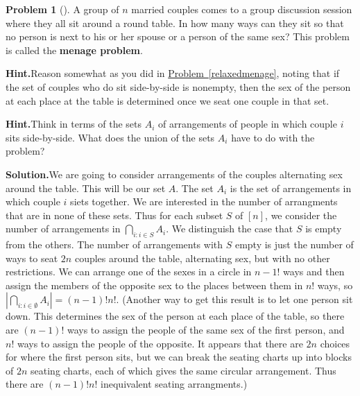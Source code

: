 \documentclass[10pt,]{book}
\newcommand{\terminology}[1]{\textbf{#1}}
\theoremstyle{plain}
\theoremstyle{definition}
\newtheorem{activity}[project]{Problem}
\theoremstyle{definition}
\numberwithin{equation}{chapter}
\begin{document}
\begin{activity}[]\label{activity-237}
A group of \(n\) married couples comes to a group discussion session where they all sit around a round table. In how many ways can they sit so that no person is next to his or her spouse or a person of the same sex? This problem is called the \terminology{menage problem}.%
\par\medskip\noindent%
\textbf{Hint.}\quad Reason somewhat as you did in \hyperref[relaxedmenage]{Problem~\ref{relaxedmenage}}, noting that if the set of couples who do sit side-by-side is nonempty, then the sex of the person at each place at the table is determined once we seat one couple in that set.%
\par\medskip\noindent%
\textbf{Hint.}\quad Think in terms of the sets \(A_i\) of arrangements of people in which couple \(i\) sits side-by-side. What does the union of the sets \(A_i\) have to do with the problem?%
\par\medskip\noindent%
\textbf{Solution.}\quad We are going to consider arrangements of the couples alternating sex around the table. This will be our set \(A\). The set \(A_i\) is the set of arrangements in which couple \(i\) siets together. We are interested in the number of arrangments that are in none of these sets. Thus for each subset \(S\) of \([n]\), we consider the number of arrangements in \(\displaystyle\bigcap_{i\colon i\in S} A_i\). We distinguish the case that \(S\) is empty from the others. The number of arrangements with \(S\) empty is just the number of ways to seat \(2n\) couples around the table, alternating sex, but with no other restrictions. We can arrange one of the sexes in a circle in \(n-1!\) ways and then assign the members of the opposite sex to the places between them in \(n!\) ways, so \(\displaystyle \left|\bigcap_{i\colon i\in \emptyset} A_i \right| = (n-1)!n!\). (Another way to get this result is to let one person sit down. This determines the sex of the person at each place of the table, so there are \((n-1)!\) ways to assign the people of the same sex of the first person, and \(n!\) ways to assign the people of the opposite. It appears that there are \(2n\) choices for where the first person sits, but we can break the seating charts up into blocks of \(2n\) seating charts, each of which gives the same circular arrangement. Thus there are \((n-1)!n!\) inequivalent seating arrangments.)%
\par

\end{activity}
\end{document}
